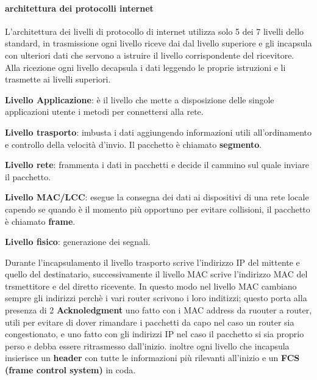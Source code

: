 \documentclass{article}
\begin{document}
\paragraph{architettura dei protocolli internet}
L'architettura dei livelli di protocollo di internet utilizza solo 5 dei 7
livelli dello standard, in trasmissione ogni livello riceve dai dal livello
superiore e gli incapsula con ulteriori dati che servono a istruire il livello
corrispondente del ricevitore. Alla ricezione ogni livello decapsula i dati
leggendo le proprie istruzioni e li trasmette ai livelli superiori.

\begin{etaremune}
    \item \textbf{Livello Applicazione}: è il livello che mette a disposizione delle singole applicazioni utente i metodi per connettersi alla rete.
    \item \textbf{Livello trasporto}: imbusta i dati aggiungendo informazioni utili all'ordinamento e controllo della velocità d'invio. Il pacchetto è chiamato \textbf{segmento}.
    \item \textbf{Livello rete}: frammenta i dati in pacchetti e decide il cammino sul quale inviare il pacchetto.
    \item \textbf{Livello MAC/LCC}: esegue la consegna dei dati ai dispositivi di una rete locale capendo se quando è il momento più opportuno per evitare collisioni, il pacchetto è chiamato \textbf{frame}.
    \item \textbf{Livello fisico}: generazione dei segnali.
\end{etaremune}
Durante l'incapsulamento il livello trasporto scrive l'indirizzo IP del mittente e quello del destinatario, successivamente il livello MAC scrive l'indirizzo MAC del trsmettitore e del diretto ricevente.
In questo modo nel livello MAC cambiano sempre gli indirizzi perchè i vari router scrivono i loro inditizzi; questo porta alla presenza di 2 \textbf{Acknoledgment} uno fatto con i MAC address da ruouter a router,
utili per evitare di dover rimandare i pacchetti da capo nel caso un router sia congestionato, e uno fatto con gli indirizzi IP nel caso il pacchetto si sia proprio perso e debba essere ritrasmesso dall'inizio.
inoltre ogni livello che incapsula insierisce un \textbf{header} con tutte le informazioni più rilevanti all'inizio e un \textbf{FCS (frame control system)} in coda.
\end{document}

